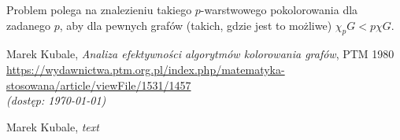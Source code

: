 \documentclass[10pt,a4paper]{article}
\begin{document}
	Problem polega na znalezieniu takiego $p$-warstwowego pokolorowania dla zadanego $p$, aby dla pewnych grafów (takich, gdzie jest to możliwe) $\chi_{p}G < p \chi G$.

	\vfill
	
	\begin{thebibliography}{0}
		Marek Kubale, \textit{Analiza efektywności algorytmów kolorowania grafów}, PTM 1980\\
		\url{https://wydawnictwa.ptm.org.pl/index.php/matematyka-stosowana/article/viewFile/1531/1457}\\
		\textit{(dostęp: \today)}
		
		Marek Kubale, \textit{text}
	\end{thebibliography}
	
\end{document}
